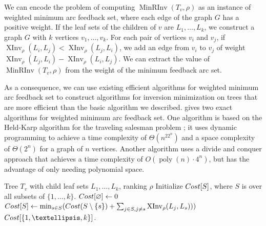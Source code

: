 \documentclass[11pt]{article}
\numberwithin{equation}{section}
\theoremstyle{definition}
\theoremstyle{plain}
\DeclareMathOperator{\poly}{poly}
\newcommand{\Cost}{\textsc{Cost}}
\newcommand{\ranking}{\rho}
\DeclareMathOperator{\XInv}{XInv}
\DeclareMathOperator{\MRInv}{MinRInv}
\begin{document}
We can encode the problem of computing $\MRInv(T_v,\ranking)$ as an instance of weighted minimum arc feedback set, where each edge of the graph $G$ has a positive weight. If the leaf sets of the children of $v$ are $L_1,\dots,L_k$, we construct a graph $G$ with $k$ vertices $v_1,\dots,v_k$. For each pair of vertices $v_i$ and $v_j$, if $\XInv_\ranking(L_i,L_j)<\XInv_\ranking(L_j,L_i)$, we add an edge from $v_i$ to $v_j$ of weight $\XInv_\ranking(L_j,L_i)-\XInv_\ranking(L_i,L_j)$. We can extract the value of $\MRInv(T_v,\ranking)$ from the weight of the minimum feedback arc set.

As a consequence, we can use existing efficient algorithms for weighted minimum arc feedback set to construct algorithms for inversion minimization on trees that are more efficient than the basic algorithm we described. \cite{Bodlaender2011} gives two exact algorithms for weighted minimum arc feedback set. One algorithm {\cite[Algorithm 1]{Bodlaender2011}} is based on the Held-Karp algorithm for the traveling salesman problem \cite{HK62}; it uses dynamic programming to achieve a time complexity of $\Theta(n^22^n)$ and a space complexity of $\Theta(2^n)$ for a graph of $n$ vertices. Another algorithm {\cite[Algorithm 2]{Bodlaender2011}} uses a divide and conquer approach that achieves a time complexity of $O(\poly(n)\cdot 4^n)$, but has the advantage of only needing polynomial space.

%
%

\begin{algorithm}[ht]
    \caption{$\MRInv(T_v, \ranking)$, Dynamic Programming}\label{alg:MRInv-DP}
    \begin{algorithmic}
        \Require Tree $T_v$ with child leaf sets $L_1,\dots,L_k$, ranking $\ranking$
        \State Initialize $\Cost[S]$, where $S$ is over all subsets of $\{1,\dots,k\}$.
        \State $\Cost[\varnothing]\gets 0$
                \State $\Cost[S]\gets \min_{s\in S} (\Cost(S\setminus \{s\}) + \sum_{j\in S, j\neq s} \XInv_\ranking(L_{j}, L_{s})))$
            \EndFor
        \EndFor
        \State \Return $\Cost[\{1,\dots,k\}]$.
    \end{algorithmic}
\end{algorithm}
\end{document}
